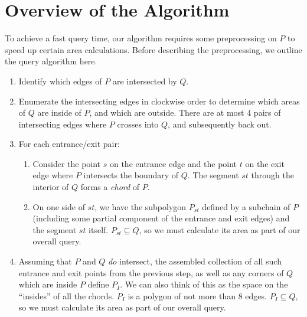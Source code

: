 \section{Overview of the Algorithm}
\label{:convexp:approach}

To achieve a fast query time, our algorithm requires some preprocessing on $P$ to speed up certain area calculations. Before describing the preprocessing, we outline the query algorithm here.

\begin{enumerate}
 \item Identify which edges of $P$ are intersected by $Q$.
 
 \item Enumerate the intersecting edges in clockwise order to determine which areas of $Q$ are inside of $P$, and which are outside. There are at most 4 pairs of intersecting edges where $P$ crosses into $Q$, and subsequently back out.
 
 \item For each entrance/exit pair:
 \begin{enumerate}
  \item Consider the point $s$ on the entrance edge and the point $t$ on the exit edge where $P$ intersects the boundary of $Q$.
  The segment $st$ through the interior of $Q$ forms a \emph{chord} of $P$.
  
  \item On one side of $st$, we have the subpolygon $P_{st}$ defined by a subchain of $P$ (including some partial component of the entrance and exit edges) and the segment $st$ itself. 
  $P_{st} \subseteq Q$, so we must calculate its area as part of our overall query.
  
 \end{enumerate}

 \item Assuming that $P$ and $Q$ \emph{do} intersect, the assembled collection of all such entrance and exit points from the previous step, as well as any corners of $Q$ which are inside $P$ define $P_I$.
We can also think of this as the space on the ``insides'' of all the chords. 
$P_I$ is a polygon of not more than 8 edges. 
$P_I \subseteq Q$, so we must calculate its area as part of our overall query.
 
\end{enumerate}


